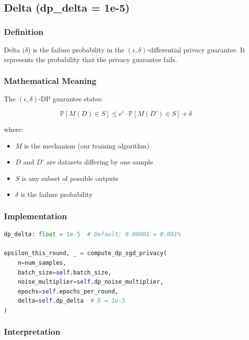 \documentclass[12pt,a4paper]{article}
\begin{document}
\subsection{Delta (dp\_delta = 1e-5)}

\subsubsection{Definition}

Delta ($\delta$) is the failure probability in the $(\epsilon, \delta)$-differential privacy guarantee. It represents the probability that the privacy guarantee fails.

\subsubsection{Mathematical Meaning}

The $(\epsilon, \delta)$-DP guarantee states:

\begin{equation}
\mathbb{P}[M(D) \in S] \leq e^{\epsilon} \cdot \mathbb{P}[M(D') \in S] + \delta
\end{equation}

where:
\begin{itemize}
    \item $M$ is the mechanism (our training algorithm)
    \item $D$ and $D'$ are datasets differing by one sample
    \item $S$ is any subset of possible outputs
    \item $\delta$ is the failure probability
\end{itemize}

\subsubsection{Implementation}

\begin{lstlisting}[language=Python, basicstyle=\small]
dp_delta: float = 1e-5  # Default: 0.00001 = 0.001%

epsilon_this_round, _ = compute_dp_sgd_privacy(
    n=num_samples,
    batch_size=self.batch_size,
    noise_multiplier=self.dp_noise_multiplier,
    epochs=self.epochs_per_round,
    delta=self.dp_delta  # δ = 1e-5
)
\end{lstlisting}

\subsubsection{Interpretation}
\end{document}

